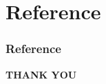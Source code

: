 \documentclass{beamer}
\begin{document}
	\section{Reference}
	\begin{frame}
		\frametitle{Reference}
		
	
	\end{frame}
	
	
	
	\begin{frame}
		\begin{center}
			\textbf{THANK YOU}
		\end{center}    
	\end{frame}
	
\end{document}
